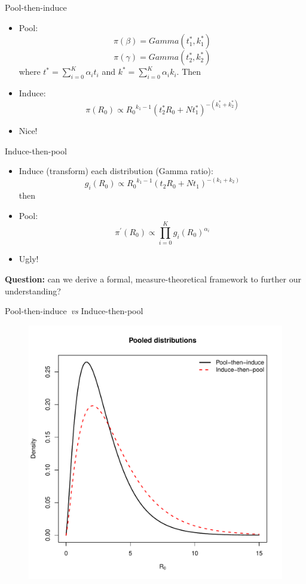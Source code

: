 \begin{frame}{Pool-then-induce}
\begin{itemize}
 \item Pool:
 \[ \pi(\beta) = Gamma(t_{1}^*, k_{1}^*) \]
 \[ \pi(\gamma) = Gamma(t_{2}^*, k_{2}^*) \]
 where $t^* = \sum_{i= 0}^K \alpha_i t_i$ and $k^* = \sum_{i= 0}^K \alpha_i k_i$.
Then
\item Induce:
\[ \pi(R_0) \propto  {R_0}^{k_1-1} (t_{2}^* R_0 + Nt_{1}^*)^{-(k_{1}^* +  k_{2}^*)}\]
\item Nice! 
\end{itemize}
\end{frame}
\begin{frame}{Induce-then-pool}
\begin{itemize}
 \item Induce (transform) each distribution (Gamma ratio):
 \[ g_{i}(R_0) \propto  {R_0}^{k_1-1} (t_2 R_0 + Nt_1)^{-(k_1 + k_2)} \]
 then
\item Pool:
\[ \pi^\prime(R_0)  \propto \prod_{i = 0}^K g_{i}(R_0) ^{\alpha_i}\]
\item Ugly!
\end{itemize}

{\large \textbf{Question:}} can we derive a formal, measure-theoretical framework to further our understanding?

\end{frame}
\begin{frame}{Pool-then-induce~\textit{vs} Induce-then-pool}
 \begin{figure}
 \begin{center}
  \includegraphics[scale=0.4]{../figures/ItP_vs_PtI_equalWeights.pdf}
 \end{center}
  \end{figure}
\end{frame}
